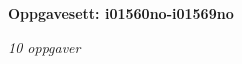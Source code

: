 \centerline{\bf Oppgavesett: i01560no-i01569no}
\vskip 10pt
\centerline{\it 10 oppgaver}\vskip 10pt
\vskip 10pt
